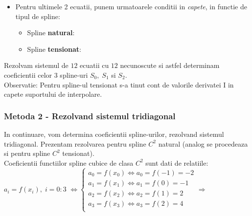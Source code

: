 \documentclass{article}
\begin{document}
\begin{itemize}
    \item Pentru ultimele 2 ecuatii, punem urmatoarele conditii in \textit{capete}, in functie de tipul de spline:
    
    \begin{itemize}
        \item Spline \textbf{natural}:
    
        \item Spline \textbf{tensionat}:
    \end{itemize}    
\end{itemize}


Rezolvam sistemul de $12$ ecuatii cu $12$ necunoscute si astfel determinam coeficientii celor $3$ spline-uri $S_0,\; S_1$ si $S_2$.\\
\tabto{0.5cm} Observatie: Pentru spline-ul tensionat s-a tinut cont de valorile derivatei I in capete suportului de interpolare.

\subsubsection{Metoda 2 - Rezolvand sistemul tridiagonal}
\tab In continuare, vom determina coeficientii spline-urilor, rezolvand sistemul tridiagonal. Prezentam rezolvarea pentru spline $C^2$ natural (analog se procedeaza si pentru spline $C^2$ tensionat).\\

Coeficientii functiilor spline cubice de clasa $C^2$ sunt dati de relatiile:\\

$a_i = f(x_i),\; i = 0:3$ $\iff \begin{cases}
  a_0 = f(x_0) \iff a_0 = f(-1) = -2 \\
  a_1 = f(x_1) \iff a_1 = f(0) = -1 \\
  a_2 = f(x_2) \iff a_2 = f(1) = 2 \\
  a_3 = f(x_3) \iff a_3 = f(2) = 4 \\
\end{cases} \Longrightarrow$
\\
\end{document}
